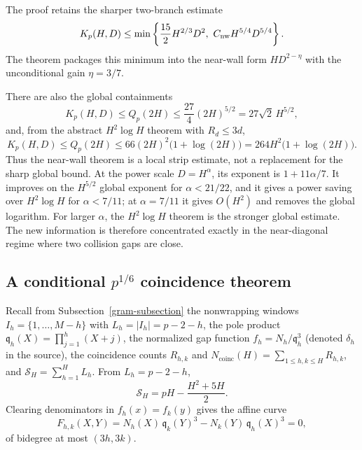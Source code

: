 \begin{remark}
\label{rem:nw-wall-map}
The proof retains the sharper two-branch estimate
\begin{equation}\label{eq:nw-sharp-min}
 K_p(H,D)
 \le\min\left\{
 \frac{15}{2}H^{2/3}D^2,
 \ C_{\rm nw}H^{5/4}D^{5/4}
 \right\}.
\end{equation}
The theorem packages this minimum into the near-wall form
$H D^{2-\eta}$ with the unconditional gain $\eta=3/7$.

There are also the global containments
\[
 K_p(H,D)\le Q_p(2H)
 \le\frac{27}{4}(2H)^{5/2}
 =27\sqrt2\,H^{5/2},
\]
and, from the abstract $H^2\log H$ theorem with $R_d\le3d$,
\[
 K_p(H,D)\le Q_p(2H)
 \le66(2H)^2\bigl(1+\log(2H)\bigr)
 =264H^2\bigl(1+\log(2H)\bigr).
\]
Thus the near-wall theorem is a local strip estimate, not a replacement
for the sharp global bound.  At the power scale $D=H^\alpha$, its exponent
is $1+11\alpha/7$.  It improves on the $H^{5/2}$ global exponent for
$\alpha<21/22$, and it gives a power saving over $H^2\log H$ for
$\alpha<7/11$; at $\alpha=7/11$ it gives $O(H^2)$ and removes the global
logarithm.  For larger $\alpha$, the $H^2\log H$ theorem is the stronger
global estimate.  The new information is therefore concentrated exactly
in the near-diagonal regime where two collision gaps are close.
\end{remark}

\subsection{A conditional $p^{1/6}$ coincidence theorem}
\label{sec:p16-coincidence}

Recall from Subsection~\ref{gram-subsection} the nonwrapping windows
$I_h=\{1,\ldots,M-h\}$ with $L_h=|I_h|=p-2-h$, the pole product
$\mathfrak q_h(X)=\prod_{j=1}^h(X+j)$, the normalized gap function
$f_h=N_h/\mathfrak q_h^3$ (denoted $\delta_h$ in the source), the
coincidence counts $R_{h,k}$ and
$N_{\mathrm{coinc}}(H)=\sum_{1\le h,k\le H}R_{h,k}$, and
$\mathcal S_H=\sum_{h=1}^HL_h$.  From $L_h=p-2-h$,
\[
 \mathcal S_H=pH-\frac{H^2+5H}{2}.
\]
Clearing denominators in $f_h(x)=f_k(y)$ gives the affine curve
\[
 F_{h,k}(X,Y)=N_h(X)\,\mathfrak q_k(Y)^3-N_k(Y)\,\mathfrak q_h(X)^3=0,
\]
of bidegree at most $(3h,3k)$.

